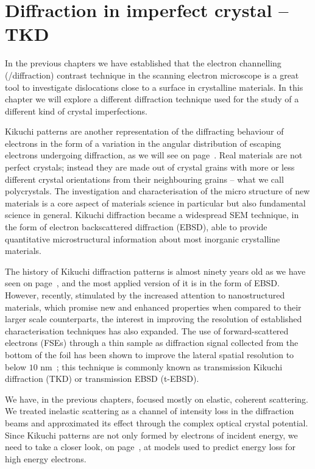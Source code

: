 \chapter{Diffraction in imperfect crystal -- TKD}
\label{chap:TKD}
In the previous chapters we have established that the electron channelling (/diffraction) contrast  technique in the scanning electron microscope is a great tool to investigate dislocations close to a surface in crystalline materials. In this chapter we will explore a different diffraction technique used for the study of a different kind of crystal imperfections. 

Kikuchi patterns are another representation of the diffracting behaviour of electrons in the form of a variation in the angular distribution of escaping electrons undergoing diffraction, as we will see on page~\pageref{sec:Kikuchi}. Real materials are not perfect crystals; instead they are made out of crystal grains with more or less different crystal orientations from their neighbouring grains -- what we call polycrystals. The investigation and characterisation of the micro structure of new materials is a core aspect of materials science in particular but also fundamental science in general. Kikuchi diffraction became a widespread SEM technique, in the form of electron backscattered diffraction (EBSD), able to provide quantitative microstructural information about most inorganic crystalline materials. 



The history of Kikuchi diffraction patterns is almost ninety years old as we have seen on page~\pageref{table:historyDiff}, and the most applied version of it is in the form of EBSD.
However, recently, stimulated by the increased attention to nanostructured materials, which promise new and enhanced properties when compared to their larger scale counterparts, the interest in improving the resolution of established characterisation techniques has also expanded. The use of forward-scattered electrons (FSEs) through a thin sample as diffraction signal collected from the bottom of the foil has been shown to improve the lateral spatial resolution to below $10$ nm~\cite{keller2011, trimby2012}; this technique is commonly known as transmission Kikuchi diffraction (TKD) or transmission EBSD (t-EBSD). 

We have, in the previous chapters, focused mostly on elastic, coherent scattering. We treated inelastic scattering as a channel of intensity loss in the diffraction beams and approximated its effect through the complex optical crystal potential. Since Kikuchi patterns are not only formed by electrons of incident energy, we need to take a closer look, on page~\pageref{sec:scatter}, at models used to predict energy loss for high energy electrons.


